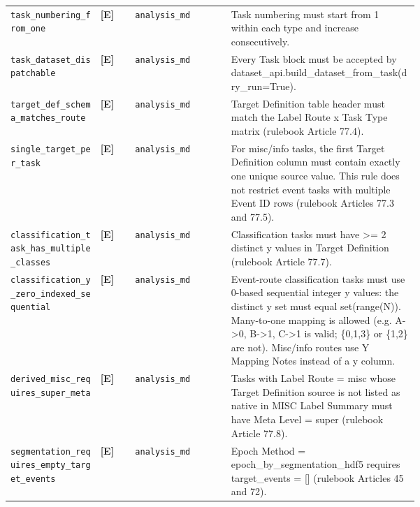 \begin{tcolorbox}
\begin{tabular}{@{}p{0.22\linewidth}ll p{0.46\linewidth}@{}}
\addlinespace[1pt]
\texttt{task\_\allowbreak{}numbering\_\allowbreak{}from\_\allowbreak{}one} & \textbf{[E]} & \texttt{analysis\_md} & Task numbering must start from 1 within each type and increase consecutively. \\
\addlinespace[1pt]
\texttt{task\_\allowbreak{}dataset\_\allowbreak{}dispatchable} & \textbf{[E]} & \texttt{analysis\_md} & Every Task block must be accepted by dataset\_api.build\_dataset\_from\_task(dry\_run=True). \\
\addlinespace[1pt]
\texttt{target\_\allowbreak{}def\_\allowbreak{}schema\_\allowbreak{}matches\_\allowbreak{}route} & \textbf{[E]} & \texttt{analysis\_md} & Target Definition table header must match the Label Route x Task Type matrix (rulebook Article 77.4). \\
\addlinespace[1pt]
\texttt{single\_\allowbreak{}target\_\allowbreak{}per\_\allowbreak{}task} & \textbf{[E]} & \texttt{analysis\_md} & For misc/info tasks, the first Target Definition column must contain exactly one unique source value. This rule does not restrict event tasks with multiple Event ID rows (rulebook Articles 77.3 and 77.5). \\
\addlinespace[1pt]
\texttt{classification\_\allowbreak{}task\_\allowbreak{}has\_\allowbreak{}multiple\_\allowbreak{}classes} & \textbf{[E]} & \texttt{analysis\_md} & Classification tasks must have >= 2 distinct y values in Target Definition (rulebook Article 77.7). \\
\addlinespace[1pt]
\texttt{classification\_\allowbreak{}y\_\allowbreak{}zero\_\allowbreak{}indexed\_\allowbreak{}sequential} & \textbf{[E]} & \texttt{analysis\_md} & Event-route classification tasks must use 0-based sequential integer y values: the distinct y set must equal set(range(N)). Many-to-one mapping is allowed (e.g. A->0, B->1, C->1 is valid; \{0,1,3\} or \{1,2\} are not). Misc/info routes use Y Mapping Notes instead of a y column. \\
\addlinespace[1pt]
\texttt{derived\_\allowbreak{}misc\_\allowbreak{}requires\_\allowbreak{}super\_\allowbreak{}meta} & \textbf{[E]} & \texttt{analysis\_md} & Tasks with Label Route = misc whose Target Definition source is not listed as native in MISC Label Summary must have Meta Level = super (rulebook Article 77.8). \\
\addlinespace[1pt]
\texttt{segmentation\_\allowbreak{}requires\_\allowbreak{}empty\_\allowbreak{}target\_\allowbreak{}events} & \textbf{[E]} & \texttt{analysis\_md} & Epoch Method = epoch\_by\_segmentation\_hdf5 requires target\_events = [] (rulebook Articles 45 and 72). \\

\end{tabular}
\end{tcolorbox}
